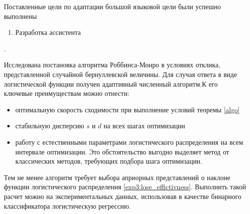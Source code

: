 Поставленные цели по адаптации большой языковой цели были успешно выполнены \begin{enumerate}
    \item Разработка ассистента
\end{enumerate}.


Исследована постановка алгоритма Роббинса-Монро в условиях отклика, представленной случайной бернуллевской величины. 
Для случая ответа в виде логистической функции получен адаптивный численный алгоритм.К его ключевые преимуществам можно отнести:
\begin{itemize}
    \item оптимальную скорость сходимости при выполнение условий теоремы \ref{algo}
    \item стабильную дисперсию $s$ и $d$ на всех шагах оптимизации
    \item работу с естественными параметрами логистического распределения на всем интервале оптимизации. Это обстоятельство выгодно выделяет метод от классических методов, требующих подбора шага оптимизации.
\end{itemize}
Тем не менее алгоритм требует выбора априорных представлений о наклоне функции логистического распределения \ref{exp3:lose_effictivness}. Выполнить такой расчет можно на экспериментальных данных, использовав 
в качестве бинарного классификатора логистическую регрессию.
